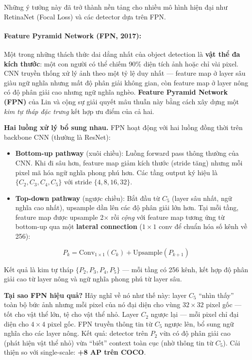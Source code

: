 Những ý tưởng này đã trở thành nền tảng cho nhiều mô hình hiện đại như RetinaNet (Focal Loss) và các detector dựa trên FPN.

\paragraph{Feature Pyramid Network (FPN, 2017):}
Một trong những thách thức dai dẳng nhất của object detection là \textbf{vật thể đa kích thước}: một con người có thể chiếm 90\% diện tích ảnh hoặc chỉ vài pixel. CNN truyền thống xử lý ảnh theo một tỷ lệ duy nhất --- feature map ở layer sâu giàu ngữ nghĩa nhưng mất độ phân giải không gian, còn feature map ở layer nông có độ phân giải cao nhưng ngữ nghĩa nghèo. \textbf{Feature Pyramid Network (FPN)} \cite{Lin2017FPN} của Lin và cộng sự giải quyết mâu thuẫn này bằng cách xây dựng một \textit{kim tự tháp đặc trưng} kết hợp ưu điểm của cả hai.

\textbf{Hai luồng xử lý bổ sung nhau.}
FPN hoạt động với hai luồng đồng thời trên backbone CNN (thường là ResNet):

\begin{itemize}
    \item \textbf{Bottom-up pathway} (xuôi chiều): Luồng forward pass thông thường của CNN. Khi đi sâu hơn, feature map giảm kích thước (stride tăng) nhưng mỗi pixel mã hóa ngữ nghĩa phong phú hơn. Các tầng output ký hiệu là $\{C_2, C_3, C_4, C_5\}$ với stride $\{4, 8, 16, 32\}$.
    \item \textbf{Top-down pathway} (ngược chiều): Bắt đầu từ $C_5$ (layer sâu nhất, ngữ nghĩa cao nhất), upsample dần lên các độ phân giải lớn hơn. Tại mỗi tầng, feature map được upsample 2× rồi \textit{cộng} với feature map tương ứng từ bottom-up qua một \textbf{lateral connection} ($1 \times 1$ conv để chuẩn hóa số kênh về 256):
\end{itemize}

\[
P_k = \text{Conv}_{1\times1}(C_k) + \text{Upsample}(P_{k+1})
\]

Kết quả là kim tự tháp $\{P_2, P_3, P_4, P_5\}$ --- mỗi tầng có 256 kênh, kết hợp độ phân giải cao từ layer nông và ngữ nghĩa phong phú từ layer sâu.

\textbf{Tại sao FPN hiệu quả?} Hãy nghĩ về nó như thế này: layer $C_5$ ``nhìn thấy'' toàn bộ bức ảnh nhưng mỗi pixel của nó đại diện cho vùng $32 \times 32$ pixel gốc --- tốt cho vật thể lớn, tệ cho vật thể nhỏ. Layer $C_2$ ngược lại --- mỗi pixel chỉ đại diện cho $4 \times 4$ pixel gốc. FPN truyền thông tin từ $C_5$ ngược lên, bổ sung ngữ nghĩa cho các layer nông. Kết quả: detector trên $P_2$ vừa có độ phân giải cao (phát hiện vật thể nhỏ) vừa ``biết'' context toàn cục (nhờ thông tin từ $C_5$). Cải thiện so với single-scale: \textbf{+8 AP trên COCO}.

